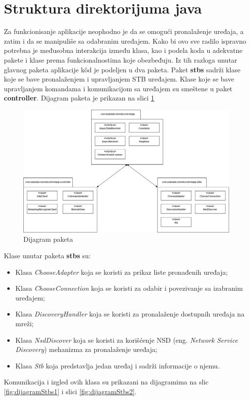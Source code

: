 \documentclass[implementacija.tex]{subfiles}
\begin{document}
\section{Struktura direktorijuma java}
Za funkcionisanje aplikacije neophodno je da se omogući pronalaženje uređaja, a zatim i da se manipuliše sa odabranim uređajem. Kako bi ovo sve radilo ispravno potrebna je međusobna interakcija između klasa, kao i podela koda u adekvatne pakete i klase prema funkcionalnostima koje obezbeđuju. Iz tih razloga unutar glavnog paketa aplikacije k\^{o}d je podeljen u dva paketa. Paket \textbf{stbs} sadrži klase koje se bave pronalaženjem i upravljanjem STB uređajem. Klase koje se bave upravljanjem komandama i komunikacijom sa uređajem su smeštene u paket \textbf{controller}.  Dijagram paketa je prikazan na slici \ref{fig:dijagramPaketa}


\begin{figure}[!ht]
  \centering
  \includegraphics[width=\textwidth]{Implementacija/dijagrami/pakage_diagram.jpg}
  \caption{Dijagram paketa}
  \label{fig:dijagramPaketa}
\end{figure}

Klase unutar paketa \textbf{stbs} su:
\begin{itemize}
\item Klasa \textit{ChooseAdapter} koja se koristi za prikaz liste pronađenih uređaja;
\item Klasa \textit{ChooseConnection} koja se koristi za odabir i povezivanje sa izabranim uređajem;
\item Klasa \textit{DiscoveryHandler} koja se koristi za pronalaženje dostupnih uređaja na mreži;
\item Klasa \textit{NsdDiscover} koja se koristi za korišćenje NSD (eng. \textit{Network Service Discovery}) mehanizma za pronalaženje uređaja;
\item Klasa \textit{Stb} koja predstavlja jedan uređaj i sadrži informacije o njemu.
\end{itemize}
Komunikacija i izgled ovih klasa su prikazani na dijagramima na slic \ref{fig:dijagramStbs1} i slici \ref{fig:dijagramStbs2}.
\end{document}
